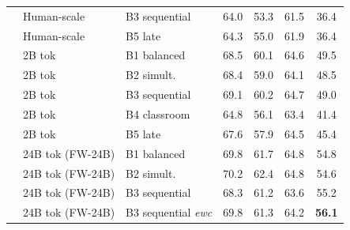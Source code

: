 \begin{table}[t]
\begin{minipage}[t]{0.49\linewidth}
\begin{tabular}{ll l cccc}
 & Human-scale & B3 sequential & \cellcolor[rgb]{0.854,1.000,0.854} 64.0 & \cellcolor[rgb]{0.958,1.000,0.958} 53.3 & \cellcolor[rgb]{0.848,1.000,0.848} 61.5 & \cellcolor[rgb]{1.000,0.850,0.850} 36.4 \\
 & Human-scale & B5 late & \cellcolor[rgb]{0.851,1.000,0.851} 64.3 & \cellcolor[rgb]{0.937,1.000,0.937} 55.0 & \cellcolor[rgb]{0.843,1.000,0.843} 61.9 & \cellcolor[rgb]{1.000,0.850,0.850} 36.4 \\
\addlinespace[1.5pt]
 & 2B tok & B1 balanced & \cellcolor[rgb]{0.807,1.000,0.807} 68.5 & \cellcolor[rgb]{0.873,1.000,0.873} 60.1 & \cellcolor[rgb]{0.807,1.000,0.807} 64.6 & \cellcolor[rgb]{1.000,0.994,0.994} 49.5 \\
 & 2B tok & B2 simult. & \cellcolor[rgb]{0.808,1.000,0.808} 68.4 & \cellcolor[rgb]{0.886,1.000,0.886} 59.0 & \cellcolor[rgb]{0.813,1.000,0.813} 64.1 & \cellcolor[rgb]{1.000,0.983,0.983} 48.5 \\
 & 2B tok & B3 sequential & \cellcolor[rgb]{0.801,1.000,0.801} 69.1 & \cellcolor[rgb]{0.871,1.000,0.871} 60.2 & \cellcolor[rgb]{0.805,1.000,0.805} 64.7 & \cellcolor[rgb]{1.000,0.989,0.989} 49.0 \\
 & 2B tok & B4 classroom & \cellcolor[rgb]{0.846,1.000,0.846} 64.8 & \cellcolor[rgb]{0.923,1.000,0.923} 56.1 & \cellcolor[rgb]{0.823,1.000,0.823} 63.4 & \cellcolor[rgb]{1.000,0.905,0.905} 41.4 \\
 & 2B tok & B5 late & \cellcolor[rgb]{0.817,1.000,0.817} 67.6 & \cellcolor[rgb]{0.900,1.000,0.900} 57.9 & \cellcolor[rgb]{0.808,1.000,0.808} 64.5 & \cellcolor[rgb]{1.000,0.949,0.949} 45.4 \\
 \addlinespace[1.5pt]
 & 24B tok (FW-24B) & B1 balanced & \cellcolor[rgb]{0.796,1.000,0.796} 69.8 & \cellcolor[rgb]{0.856,1.000,0.856} 61.7 & \cellcolor[rgb]{0.804,1.000,0.804} 64.8 & \cellcolor[rgb]{1.000,0.932,0.932} 54.8 \\
 & 24B tok (FW-24B) & B2 simult. & \cellcolor[rgb]{0.792,1.000,0.792} 70.2 & \cellcolor[rgb]{0.849,1.000,0.849} 62.4 & \cellcolor[rgb]{0.804,1.000,0.804} 64.8 & \cellcolor[rgb]{1.000,0.934,0.934} 54.6 \\
 & 24B tok (FW-24B) & B3 sequential & \cellcolor[rgb]{0.811,1.000,0.811} 68.3 & \cellcolor[rgb]{0.859,1.000,0.859} 61.2 & \cellcolor[rgb]{0.816,1.000,0.816} 63.6 & \cellcolor[rgb]{1.000,0.928,0.928} 55.2 \\
 & 24B tok (FW-24B) & B3 sequential {\scriptsize\textit{ewc}} & \cellcolor[rgb]{0.796,1.000,0.796} 69.8 & \cellcolor[rgb]{0.858,1.000,0.858} 61.3 & \cellcolor[rgb]{0.810,1.000,0.810} 64.2 & \cellcolor[rgb]{1.000,0.919,0.919} \textbf{56.1} \\

\end{tabular}
\end{minipage}
\end{table}
